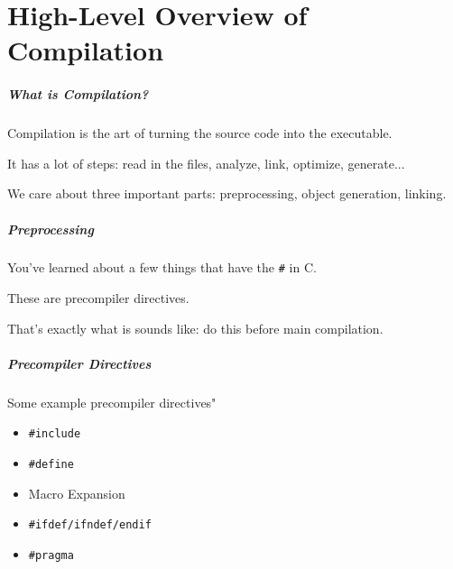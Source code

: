\part{High-Level Overview of Compilation}

\begin{frame}
\partpage
\end{frame}

\begin{frame}
\frametitle{What is Compilation?}

Compilation is the art of turning the source code into the executable.

It has a lot of steps: read in the files, analyze, link, optimize, generate...

We care about three important parts: preprocessing, object generation, linking.

\end{frame}

\begin{frame}
\frametitle{Preprocessing}

You've learned about a few things that have the \texttt{\#} in C.

These are \alert{precompiler directives}. 

That's exactly what is sounds like: do this before main compilation.

\end{frame}

\begin{frame}
\frametitle{Precompiler Directives}

Some example precompiler directives"

\begin{itemize}
	\item \texttt{\#include}
	\item \texttt{\#define}
	\item Macro Expansion
	\item \texttt{\#ifdef/ifndef/endif}	
	\item \texttt{\#pragma}
\end{itemize}

\end{frame}


